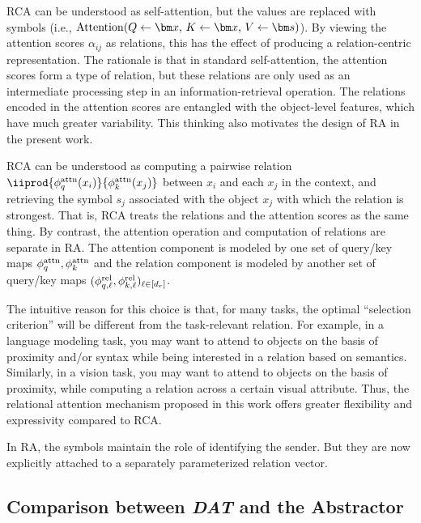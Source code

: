 RCA can be understood as self-attention, but the values are replaced with symbols (i.e., $\Attn(Q \gets \x,\, K \gets \x,\, V \gets \s)$). By viewing the attention scores $\alpha_{ij}$ as relations, this has the effect of producing a relation-centric representation. The rationale is that in standard self-attention, the attention scores form a type of relation, but these relations are only used as an intermediate processing step in an information-retrieval operation. The relations encoded in the attention scores are entangled with the object-level features, which have much greater variability. This thinking also motivates the design of RA in the present work.

RCA can be understood as computing a pairwise relation $\iiprod{\phiqattn(x_i)}{\phikattn(x_j)}$ between $x_i$ and each $x_j$ in the context, and retrieving the symbol $s_j$ associated with the object $x_j$ with which the relation is strongest. That is, RCA treats the relations and the attention scores as the same thing. By contrast, the attention operation and computation of relations are separate in RA. The attention component is modeled by one set of query/key maps $\phi_q^{\mathrm{attn}}, \phi_k^{\mathrm{attn}}$ and the relation component is modeled by another set of query/key maps $(\phi_{q, \ell}^{\mathrm{rel}}, \phi_{k, \ell}^{\mathrm{rel}})_{\ell \in [d_r]}$.

The intuitive reason for this choice is that, for many tasks, the optimal ``selection criterion'' will be different from the task-relevant relation. For example, in a language modeling task, you may want to attend to objects on the basis of proximity and/or syntax while being interested in a relation based on semantics. Similarly, in a vision task, you may want to attend to objects on the basis of proximity, while computing a relation across a certain visual attribute. Thus, the relational attention mechanism proposed in this work offers greater flexibility and expressivity compared to RCA.

In RA, the symbols maintain the role of identifying the sender. But they are now explicitly attached to a separately parameterized relation vector.

\subsection{Comparison between \textit{DAT} and the Abstractor}

